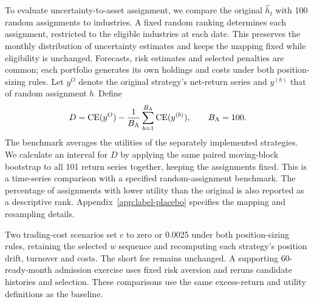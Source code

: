 To evaluate uncertainty-to-asset assignment, we compare the original $\widehat h_t$ with 100 random assignments to industries. A fixed random ranking determines each assignment, restricted to the eligible industries at each date. This preserves the monthly distribution of uncertainty estimates and keeps the mapping fixed while eligibility is unchanged. Forecasts, risk estimates and selected penalties are common; each portfolio generates its own holdings and costs under both position-sizing rules. Let $y^O$ denote the original strategy's net-return series and $y^{(b)}$ that of random assignment $b$. Define
\begin{equation}
D=\operatorname{CE}(y^O)-\frac{1}{B_{\mathrm{A}}}\sum_{b=1}^{B_{\mathrm{A}}}\operatorname{CE}(y^{(b)}),
\qquad B_{\mathrm{A}}=100.
\label{eq:assignment-advantage}
\end{equation}
The benchmark averages the utilities of the separately implemented strategies. We calculate an interval for $D$ by applying the same paired moving-block bootstrap to all 101 return series together, keeping the assignments fixed. This is a time-series comparison with a specified random-assignment benchmark. The percentage of assignments with lower utility than the original is also reported as a descriptive rank. Appendix~\ref{app:label-placebo} specifies the mapping and resampling details.

Two trading-cost scenarios set $c$ to zero or 0.0025 under both position-sizing rules, retaining the selected $w$ sequence and recomputing each strategy's position drift, turnover and costs. The short fee remains unchanged. A supporting 60-ready-month admission exercise uses fixed risk aversion and reruns candidate histories and selection. These comparisons use the same excess-return and utility definitions as the baseline.
